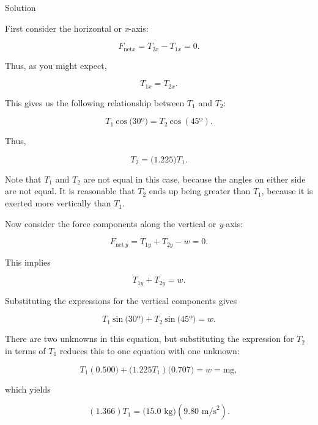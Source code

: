 \documentclass[
]{book}
\begin{document}
{Solution}

First consider the horizontal or \emph{x}-axis:

\leavevmode{}%
\[{{F_{\text{net}x} = {T_{\text{2}x} - T_{\text{1}x}}} = 0}.\]

Thus, as you might expect,

\leavevmode{}%
\[{T_{\text{1}x} = T_{\text{2}x}}.\]

This gives us the following relationship between \(T_{1}{}\) and
\(T_{2}{}\):

\leavevmode{}%
\[{T_{1}\ \text{cos}\ (\text{30º}{) = T_{2}}\ \text{cos}\ (\text{45º})}.\]

Thus,

\leavevmode{}%
\[{{T_{2} = (}1\text{.}\text{225})T_{1}}.\]

Note that \(T_{1}{}\) and \(T_{2}{}\) are not equal in this case, because
the angles on either side are not equal. It is reasonable that \(T_{2}{}\)
ends up being greater than \(T_{1}{}\), because it is exerted more
vertically than \(T_{1}{}\).

Now consider the force components along the vertical or \emph{y}-axis:

\leavevmode{}%
\[{{F_{\text{net}\ y} = {{T_{\text{1}y} + T_{\text{2}y}} - w}} = 0}.\]

This implies

\leavevmode{}%
\[{{T_{\text{1}y} + T_{\text{2}y}} = w}.\]

Substituting the expressions for the vertical components gives

\leavevmode{}%
\[{T_{1}\ \text{sin}\ (\text{30º}{) + T_{2}}\ \text{sin}\ (\text{45º}{) = w}}.\]

There are two unknowns in this equation, but substituting the expression
for \(T_{2}{}\) in terms of \(T_{1}{}\) reduces this to one equation with
one unknown:

\leavevmode{}%
\[{T_{1}(0\text{.}\text{500}{) + (}1\text{.}\text{225}T_{1})(0\text{.}\text{707}{{) = w} = \text{mg}}},\]

which yields

\leavevmode{}%
\[{\left( {1\text{.}\text{366}} \right){T_{1} = (}\text{15}\text{.}\text{0\ kg})(9\text{.}\text{80\ m/s}^{2})}.\]
\end{document}
